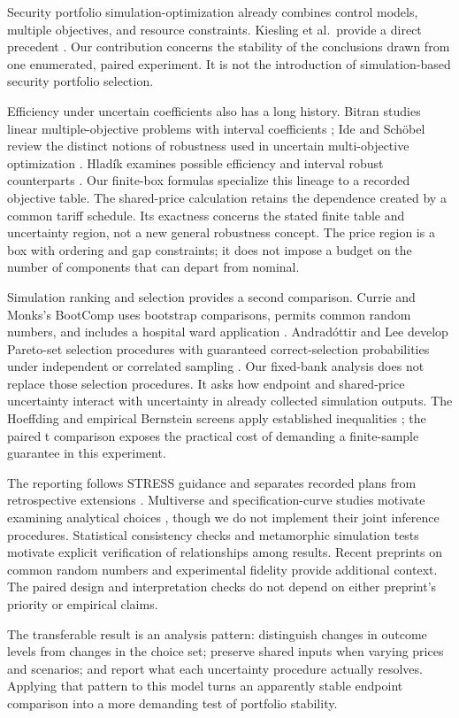 Security portfolio simulation-optimization already combines control models,
multiple objectives, and resource constraints. Kiesling et al.\ provide a
direct precedent \cite{kiesling2016}. Our contribution concerns the stability
of the conclusions drawn from one enumerated, paired experiment. It is not
the introduction of simulation-based security portfolio selection.

Efficiency under uncertain coefficients also has a long history. Bitran
studies linear multiple-objective problems with interval coefficients
\cite{bitran1980}; Ide and Sch\"obel review the distinct notions of robustness
used in uncertain multi-objective optimization \cite{ide2016}. Hlad\'ik
examines possible efficiency and interval robust counterparts
\cite{hladik2017}. Our finite-box formulas specialize this lineage to a
recorded objective table. The shared-price calculation retains the dependence
created by a common tariff schedule. Its exactness concerns the stated
finite table and uncertainty region, not a new general robustness concept.
The price region is a box with ordering and gap constraints; it does not
impose a budget on the number of components that can depart from nominal.

Simulation ranking and selection provides a second comparison. Currie and
Monks's BootComp uses bootstrap comparisons, permits common random numbers,
and includes a hospital ward application \cite{currie2021}. Andrad\'ottir
and Lee develop Pareto-set selection procedures with guaranteed
correct-selection probabilities under independent or correlated sampling
\cite{andradottir2021}. Our fixed-bank analysis does not replace those
selection procedures. It asks how endpoint and shared-price uncertainty
interact with uncertainty in already collected simulation outputs.
The Hoeffding and empirical Bernstein screens apply established inequalities
\cite{hoeffding1963,maurer2009}; the paired t comparison exposes the practical
cost of demanding a finite-sample guarantee in this experiment.

The reporting follows STRESS guidance \cite{monks2019} and separates
recorded plans from retrospective extensions \cite{nosek2018}.
Multiverse and specification-curve studies motivate examining analytical
choices \cite{steegen2016,simonsohn2020}, though we do not implement their
joint inference procedures. Statistical consistency checks \cite{nuijten2016}
and metamorphic simulation tests \cite{raunak2021} motivate explicit
verification of relationships among results. Recent preprints on common
random numbers \cite{buffalo2026} and experimental fidelity \cite{yu2026}
provide additional context. The paired design and interpretation checks do
not depend on either preprint's priority or empirical claims.

The transferable result is an analysis pattern: distinguish changes in
outcome levels from changes in the choice set; preserve shared inputs when
varying prices and scenarios; and report what each uncertainty procedure
actually resolves. Applying that pattern to this model turns an apparently
stable endpoint comparison into a more demanding test of portfolio stability.
